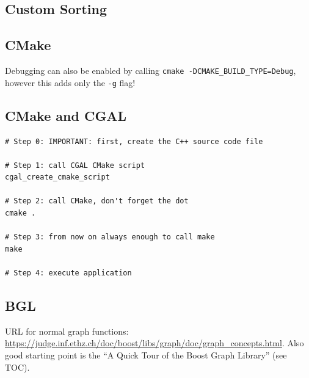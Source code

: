 \documentclass[a4paper,titlepage]{article}
\begin{document}
\subsection{Custom Sorting}


\subsection{CMake}


Debugging can also be enabled by calling \texttt{cmake -DCMAKE\_BUILD\_TYPE=Debug}, however this adds only the \texttt{-g} flag!

\subsection{CMake and CGAL}
\begin{lstlisting}
# Step 0: IMPORTANT: first, create the C++ source code file

# Step 1: call CGAL CMake script
cgal_create_cmake_script

# Step 2: call CMake, don't forget the dot
cmake .

# Step 3: from now on always enough to call make
make

# Step 4: execute application
\end{lstlisting}

\subsection{BGL}
URL for normal graph functions: \url{https://judge.inf.ethz.ch/doc/boost/libs/graph/doc/graph_concepts.html}. Also good starting point is the ``A Quick Tour of the Boost Graph Library'' (see TOC).


\end{document}
